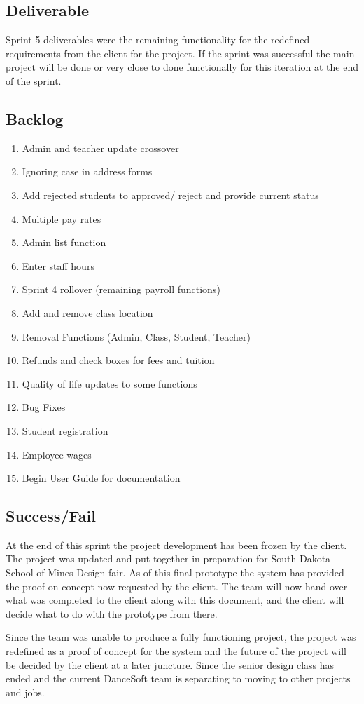 \subsection{Deliverable}

Sprint 5 deliverables were the remaining functionality for the redefined requirements from the client for the project. If the sprint was successful the main project will be done or very close to done functionally for this iteration at the end of the sprint.\\

\subsection{Backlog}

\begin{enumerate}
\item Admin and teacher update crossover
\item Ignoring case in address forms
\item Add rejected students to approved/ reject and provide current status
\item Multiple pay rates
\item Admin list function
\item Enter staff hours
\item Sprint 4 rollover (remaining payroll functions)
\item Add and remove class location
\item Removal Functions (Admin, Class, Student, Teacher)
\item Refunds and check boxes for fees and tuition
\item Quality of life updates to some functions
\item Bug Fixes
\item Student registration
\item Employee wages
\item Begin User Guide for documentation
\end{enumerate}


\subsection{Success/Fail}
At the end of this sprint the project development has been frozen by the client. The project was updated and put together in preparation for South Dakota School of Mines Design fair. As of this final prototype the system has provided the proof on concept now requested by the client. The team will now hand over what was completed to the client along with this document, and the client will decide what to do with the prototype from there.

Since the team was unable to produce a fully functioning project, the project was redefined as a proof of concept for the system and the future of the project will be decided by the client at a later juncture. Since the senior design class has ended and the current DanceSoft team is separating to moving to other projects and jobs.
